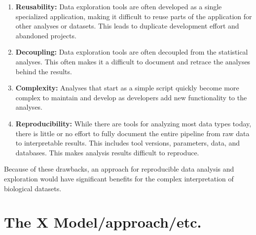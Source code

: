 \begin{enumerate}
    \item \textbf{Reusability:} Data exploration tools are often
        developed as a single specialized application, making it difficult to
        reuse parts of the application for other analyses or datasets. This
        leads to duplicate development effort and abandoned projects. 
    \item \textbf{Decoupling:} Data exploration tools are often decoupled from
        the statistical analyses. This often makes it a difficult to document
        and retrace the analyses behind the results. 
    \item \textbf{Complexity:} 
        Analyses that start as a simple script quickly become more complex to
        maintain and develop as developers add new functionality to the
        analyses. %
    \item \textbf{Reproducibility:} While there are tools for analyzing most
        data types today, there is little or no effort to fully document the
        entire 
        pipeline from raw data to interpretable results. This includes
        tool versions, parameters, data, and databases. This makes analysis
        results difficult to reproduce. 
\end{enumerate} 

Because of these drawbacks, an approach for reproducible data analysis and
exploration would have significant benefits for the 
complex interpretation
of biological datasets.

\section{The X Model/approach/etc.} 


